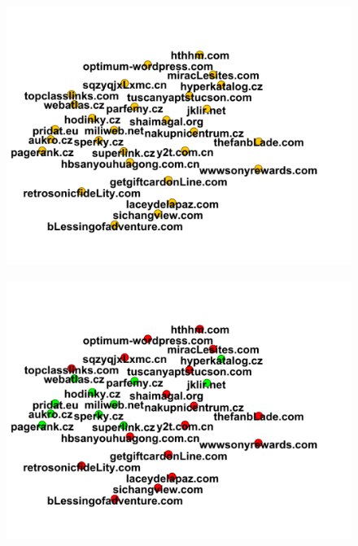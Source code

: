 \documentclass[conference]{IEEEtran}
\begin{document}
\begin{figure}[htbp]
 \centerline{\includegraphics[width=\columnwidth]{figs/04before.png}}
 \caption{}
\end{figure}

\begin{figure}[htbp]
 \centerline{\includegraphics[width=\columnwidth]{figs/04after.png}}
 \caption{}
\end{figure}
\end{document}
